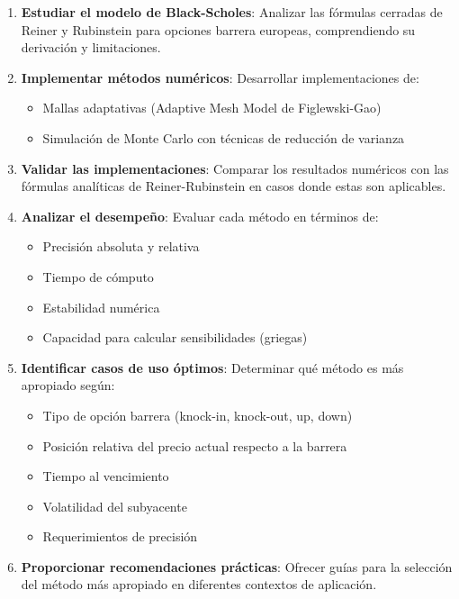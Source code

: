 \begin{enumerate}
    \item \textbf{Estudiar el modelo de Black-Scholes}: Analizar las fórmulas cerradas de Reiner y Rubinstein para opciones barrera europeas, comprendiendo su derivación y limitaciones.
    
    \item \textbf{Implementar métodos numéricos}: Desarrollar implementaciones de:
    \begin{itemize}
        \item Mallas adaptativas (Adaptive Mesh Model de Figlewski-Gao)
        \item Simulación de Monte Carlo con técnicas de reducción de varianza
    \end{itemize}
    
    \item \textbf{Validar las implementaciones}: Comparar los resultados numéricos con las fórmulas analíticas de Reiner-Rubinstein en casos donde estas son aplicables.
    
    \item \textbf{Analizar el desempeño}: Evaluar cada método en términos de:
    \begin{itemize}
        \item Precisión absoluta y relativa
        \item Tiempo de cómputo
        \item Estabilidad numérica
        \item Capacidad para calcular sensibilidades (griegas)
    \end{itemize}
    
    \item \textbf{Identificar casos de uso óptimos}: Determinar qué método es más apropiado según:
    \begin{itemize}
        \item Tipo de opción barrera (knock-in, knock-out, up, down)
        \item Posición relativa del precio actual respecto a la barrera
        \item Tiempo al vencimiento
        \item Volatilidad del subyacente
        \item Requerimientos de precisión
    \end{itemize}
    
    \item \textbf{Proporcionar recomendaciones prácticas}: Ofrecer guías para la selección del método más apropiado en diferentes contextos de aplicación.
\end{enumerate}

